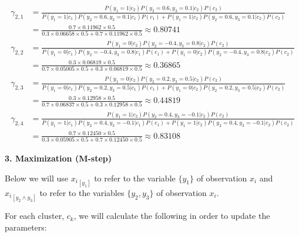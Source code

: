 \documentclass[12pt]{article}
\begin{document}
\begin{enumerate}[leftmargin=\labelsep]
        \vskip -0.5cm
        \begingroup
        \addtolength{\jot}{0.5em}
        \begin{align*}
          \gamma_{2,1} & = \frac{P(y_1=1|c_2)P(y_2=0.6,y_3=0.1|c_2)P(c_2)}{P(y_1=1|c_1)P(y_2=0.6,y_3=0.1|c_1)P(c_1) + P(y_1=1|c_2)P(y_2=0.6,y_3=0.1|c_2)P(c_2)}    \\
                       & = \frac{0.7 \times 0.11962 \times 0.5}{0.3 \times 0.06658 \times 0.5 + 0.7 \times 0.11962 \times 0.5} \approx 0.80741                     \\
          \gamma_{2,2} & = \frac{P(y_1=0|c_2)P(y_2=-0.4,y_3=0.8|c_2)P(c_2)}{P(y_1=0|c_1)P(y_2=-0.4,y_3=0.8|c_1)P(c_1) + P(y_1=0|c_2)P(y_2=-0.4,y_3=0.8|c_2)P(c_2)} \\
                       & = \frac{0.3 \times 0.06819 \times 0.5}{0.7 \times 0.05005 \times 0.5 + 0.3 \times 0.06819 \times 0.5} \approx 0.36865                     \\
          \gamma_{2,3} & = \frac{P(y_1=0|c_2)P(y_2=0.2,y_3=0.5|c_2)P(c_2)}{P(y_1=0|c_1)P(y_2=0.2,y_3=0.5|c_1)P(c_1) + P(y_1=0|c_2)P(y_2=0.2,y_3=0.5|c_2)P(c_2)}    \\
                       & = \frac{0.3 \times 0.12958 \times 0.5}{0.7 \times 0.06837 \times 0.5 + 0.3 \times 0.12958 \times 0.5} \approx 0.44819                     \\
          \gamma_{2,4} & = \frac{P(y_1=1|c_2)P(y_2=0.4,y_3=-0.1|c_2)P(c_2)}{P(y_1=1|c_1)P(y_2=0.4,y_3=-0.1|c_1)P(c_1) + P(y_1=1|c_2)P(y_2=0.4,y_3=-0.1|c_2)P(c_2)} \\
                       & = \frac{0.7 \times 0.12450 \times 0.5}{0.3 \times 0.05905 \times 0.5 + 0.7 \times 0.12450 \times 0.5} \approx 0.83108
        \end{align*}
        \endgroup

        \vskip 0.2cm
          {
            \color{stepscolor}
            \begin{large}\textbf{3. Maximization (M-step)}\end{large}
          }
        \vskip 0.1cm

        Below we will use ${x_i}_{[y_1]}$ to refer to the variable $\{y_1\}$ of observation $x_i$ and
        ${x_i}_{[y_2 \land y_3]}$ to refer to the variables $\{y_2,y_3\}$ of observation $x_i$.

        For each cluster, $c_k$, we will calculate the following in order to update the parameters:


\end{enumerate}
\end{document}
